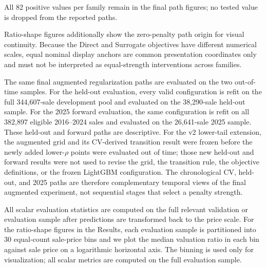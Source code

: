 \documentclass[10pt]{article}
\theoremstyle{definition}
\newcommand{\1}{\mathbf{1}}
\begin{document}
All 82 positive values per family remain in the final path figures; no tested value is dropped from the reported paths.

Ratio-shape figures additionally show the zero-penalty path origin for visual continuity. Because the Direct and Surrogate objectives have different numerical scales, equal nominal display anchors are common presentation coordinates only and must not be interpreted as equal-strength interventions across families.


The same final augmented regularization paths are evaluated on the two out-of-time samples. For the held-out evaluation, every valid configuration is refit on the full
344,607-sale development pool and evaluated on the 38,290-sale held-out sample. For
the 2025 forward evaluation, the same configuration is refit on all 382,897 eligible
2016--2024 sales and evaluated on the 26,641-sale 2025 sample.
These held-out and forward paths are descriptive. For the v2 lower-tail extension, the augmented grid and its CV-derived transition result were frozen before the newly added lower-$\rho$ points were evaluated out of time; those new held-out and forward results were not used to revise the grid, the transition rule, the objective definitions, or the frozen LightGBM configuration. The chronological CV, held-out, and 2025 paths are therefore complementary temporal views of the final augmented experiment, not sequential stages that select a penalty strength.

All scalar evaluation statistics are computed on the full relevant validation or
evaluation sample after predictions are transformed back to the price scale. For
the ratio-shape figures in the Results, each evaluation sample is partitioned into
30 equal-count sale-price bins and we plot the median valuation ratio in each bin
against sale price on a logarithmic horizontal axis. The binning is used only for
visualization; all scalar metrics are computed on the full evaluation sample.
\end{document}
